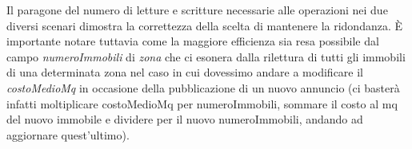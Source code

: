 \documentclass[a4paper,12pt]{report}
\begin{document}
            Il paragone del numero di letture e scritture necessarie alle operazioni nei due diversi scenari
            dimostra la correttezza della scelta di mantenere la ridondanza. È importante notare tuttavia come
            la maggiore efficienza sia resa possibile dal campo \textit{numeroImmobili} di \textit{zona} che
            ci esonera dalla rilettura di tutti gli immobili di una determinata zona nel caso in cui dovessimo 
            andare a modificare il \textit{costoMedioMq} in occasione della pubblicazione di un nuovo annuncio 
            (ci basterà infatti moltiplicare costoMedioMq per numeroImmobili, sommare il costo al mq del nuovo 
            immobile e dividere per il nuovo numeroImmobili, andando ad aggiornare quest'ultimo). \\
            \\
      
\end{document}
